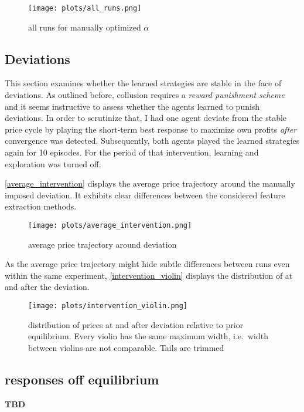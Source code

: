 \begin{figure}
	\texttt{[image: plots/all\_runs.png]}
	\caption{all runs for manually optimized $\alpha$}
	\label{all_runs}
\end{figure}



\clearpage
\subsection{Deviations}

This section examines whether the learned strategies are stable in the face of deviations. As outlined before, collusion requires a \emph{reward punishment scheme} and it seems instructive to assess whether the agents learned to punish deviations. In order to scrutinize that, I had one agent deviate from the stable price cycle by playing the short-term best response to maximize own profits \emph{after} convergence was detected. Subsequently, both agents played the learned strategies again for 10 episodes. For the period of that intervention, learning and exploration was turned off.

\autoref{average_intervention} displays the average price trajectory around the manually imposed deviation. It exhibits clear differences between the considered feature extraction methods. 

\begin{figure}
	\texttt{[image: plots/average\_intervention.png]}
	\caption{average price trajectory around deviation}
	\label{average_intervention}
\end{figure}

As the average price trajectory might hide subtle differences between runs even within the same experiment, \autoref{intervention_violin} displays the distribution of at and after the deviation.


\begin{figure}
	\texttt{[image: plots/intervention\_violin.png]}
	\caption{distribution of prices at and after deviation relative to prior equilibrium. Every violin has the same maximum width, i.e.\ width between violins are not comparable. Tails are trimmed}
	\label{intervention_violin}
\end{figure}

\pagebreak
\subsection{responses off equilibrium}

\textbf{TBD}



